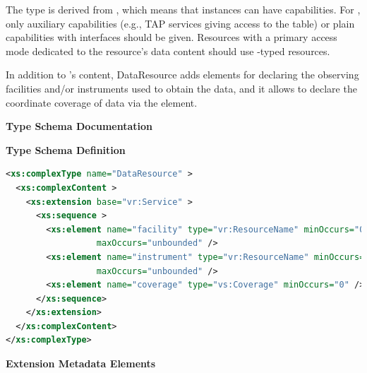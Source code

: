 \documentclass[11pt,a4paper]{ivoa}
\begin{document}
The type is derived from , which means that instances
can have
capabilities.  For , only auxiliary capabilities
(e.g., TAP services giving access to the table) or plain capabilities
with  interfaces should be given.  Resources with a
primary access mode dedicated to the resource's data content should use
-typed resources.

In addition to 's content, DataResource adds
elements for declaring the observing facilities and/or instruments used
to obtain the data, and it allows to declare
the coordinate coverage of data via the 
element.

\begin{generated}
\begingroup
      	\renewcommand*\descriptionlabel[1]{%
      	\hbox to 5.5em{\emph{#1}\hfil}}\vspace{2ex}\noindent\textbf{ Type Schema Documentation}



\vspace{1ex}\noindent\textbf{ Type Schema Definition}

\begin{lstlisting}[language=XML,basicstyle=\footnotesize]
<xs:complexType name="DataResource" >
  <xs:complexContent >
    <xs:extension base="vr:Service" >
      <xs:sequence >
        <xs:element name="facility" type="vr:ResourceName" minOccurs="0"
                  maxOccurs="unbounded" />
        <xs:element name="instrument" type="vr:ResourceName" minOccurs="0"
                  maxOccurs="unbounded" />
        <xs:element name="coverage" type="vs:Coverage" minOccurs="0" />
      </xs:sequence>
    </xs:extension>
  </xs:complexContent>
</xs:complexType>
\end{lstlisting}

\vspace{0.5ex}\noindent\textbf{ Extension Metadata Elements}


\end{generated}
\end{document}
